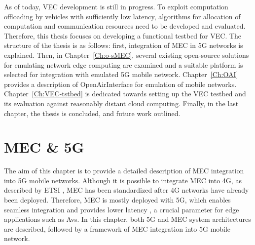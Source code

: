 \documentclass[12pt,a4paper,twoside]{report}
\begin{document}
As of today, VEC development is still in progress. To exploit computation offloading by vehicles with sufficiently low latency, algorithms for allocation of computation and communication resources need to be developed and evaluated. Therefore, this thesis focuses on developing a functional testbed for VEC. The structure of the thesis is as follows: first, integration of MEC in 5G networks is explained. Then, in Chapter~\ref{Ch:o-sMEC}, several existing open-source solutions for emulating network edge computing are examined and a suitable platform is selected for integration with emulated 5G mobile network. Chapter~\ref{Ch:OAI} provides a description of OpenAirInterface for emulation of mobile networks. Chapter~\ref{Ch:VEC-tstbed} is dedicated towards setting up the VEC testbed and its evaluation against reasonably distant cloud computing. Finally, in the last chapter, the thesis is concluded, and future work outlined.
\chapter{MEC \& 5G}
\label{Ch:MECn5G}
The aim of this chapter is to provide a detailed description of MEC integration into 5G mobile networks. Although it is possible to integrate MEC into 4G, as described by ETSI \cite{ETSI:wp24}, MEC has been standardized after 4G networks have already been deployed. Therefore, MEC is mostly deployed with 5G, which enables seamless integration \cite{ETSI:wp28} and provides lower latency \cite{dahlman-2020-5g}, a crucial parameter for edge applications such as Avs.  In this chapter, both 5G and MEC system architectures are described, followed by a framework of MEC integration into 5G mobile network.
\end{document}
